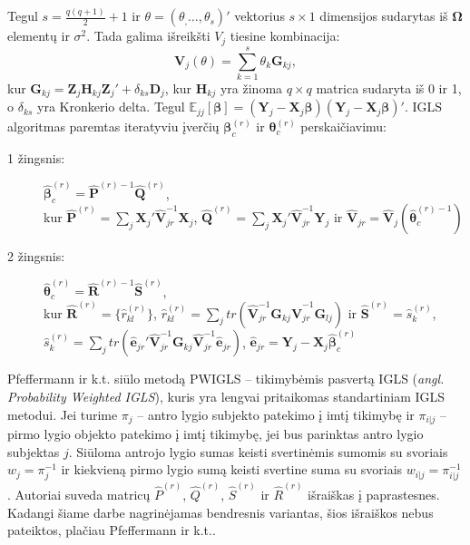 \documentclass[11pt,a4paper]{article}
\begin{document}
\indent Tegul $s=\frac{q(q+1)}{2}+1$ ir $\theta=(\theta_,\dots,\theta_s)'$ vektorius $s\times 1$ dimensijos sudarytas iš $\boldsymbol{\Omega}$ elementų ir $\sigma^2$. Tada galima išreikšti $V_j$ tiesine kombinacija:
\begin{equation*}
\mathbf{V}_j(\theta)=\sum_{k=1}^s \theta_k \mathbf{G}_{kj},
\end{equation*}
kur $\mathbf{G}_{kj}=\mathbf{Z}_j\mathbf{H}_{kj}\mathbf{Z}_j'+\delta_{ks}\mathbf{D}_j$, kur $\mathbf{H}_{kj}$ yra žinoma $q\times q$ matrica sudaryta iš 0 ir 1, o $\delta_{ks}$ yra Kronkerio delta. Tegul $\mathbb{E}_{jj}[\boldsymbol{\beta}]=(\mathbf{Y}_j-\mathbf{X}_j\boldsymbol{\beta})(\mathbf{Y}_j-\mathbf{X}_j\boldsymbol{\beta})'$. IGLS algoritmas paremtas iteratyviu įverčių $\boldsymbol{\beta}_c^{(r)}$ ir $\boldsymbol{\theta}_c^{(r)}$ perskaičiavimu:
\begin{description}
\item[1 žingsnis:] $\hat{\boldsymbol{\beta}}_c^{(r)}=\hat{\mathbf{P}}^{(r)-1}\hat{\mathbf{Q}}^{(r)}$,\\
kur $\hat{\mathbf{P}}^{(r)}=\sum_j\mathbf{X}_j'\hat{\mathbf{V}}_{jr}^{-1}\mathbf{X}_j$, $\hat{\mathbf{Q}}^{(r)}=\sum_j\mathbf{X}_j'\hat{\mathbf{V}}_{jr}^{-1}\mathbf{Y}_j$ ir $\hat{\mathbf{V}}_{jr}=\hat{\mathbf{V}}_j\left(\hat{\boldsymbol{\theta}}_c^{(r)-1}\right)$
\item[2 žingsnis:] $\hat{\boldsymbol{\theta}}_c^{(r)}=\hat{\mathbf{R}}^{(r)-1}\hat{\mathbf{S}}^{(r)}$,\\
kur $\hat{\mathbf{R}}^{(r)}=\{\hat{r}_{kl}^{(r)}\}$, $\hat{r}_{kl}^{(r)}=\sum_jtr\left(\hat{\mathbf{V}}_{jr}^{-1}\mathbf{G}_{kj}\hat{\mathbf{V}}_{jr}^{-1}\mathbf{G}_{lj}\right)$ ir $\hat{\mathbf{S}}^{(r)}=\hat{s}_k^{(r)}$, $\hat{s}_k^{(r)}=\sum_jtr\left(\hat{\mathbf{e}}_{jr}'\hat{\mathbf{V}}_{jr}^{-1}\mathbf{G}_{kj}\hat{\mathbf{V}}_{jr}^{-1}\hat{\mathbf{e}}_{jr}\right)$, $\hat{\mathbf{e}}_{jr}=\mathbf{Y}_j - \mathbf{X}_j\hat{\boldsymbol{\beta}}_c^{(r)}$
\end{description}

\indent Pfeffermann ir k.t. siūlo metodą PWIGLS -- tikimybėmis pasvertą IGLS (\textit{angl. Probability Weighted IGLS}), kuris yra lengvai pritaikomas standartiniam IGLS metodui. Jei turime $\pi_j$ -- antro lygio subjekto patekimo į imtį tikimybę ir $\pi_{i|j}$ -- pirmo lygio objekto patekimo į imtį tikimybę, jei bus parinktas antro lygio subjektas $j$. Siūloma antrojo lygio sumas keisti svertinėmis sumomis su svoriais $w_j=\pi_j^{-1}$ ir kiekvieną pirmo lygio sumą keisti svertine suma su svoriais $w_{i|j}=\pi_{i|j}^{-1}$. Autoriai suveda matricų $\hat{P}^{(r)}$, $\hat{Q}^{(r)}$, $\hat{S}^{(r)}$ ir $\hat{R}^{(r)}$ išraiškas į paprastesnes. Kadangi šiame darbe nagrinėjamas bendresnis variantas, šios išraiškos nebus pateiktos, plačiau  Pfeffermann ir k.t.\cite{pfeff}.
\end{document}
